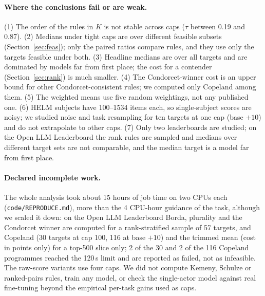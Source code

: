 \paragraph{Where the conclusions fail or are weak.}
(1) The order of the rules in $K$ is not stable across caps ($\tau$ between 0.19 and 0.87). (2) Medians under tight caps are over different feasible subsets (Section~\ref{sec:feas}); only the paired ratios compare rules, and they use only the targets feasible under both. (3) Headline medians are over all targets and are dominated by models far from first place; the cost for a contender (Section~\ref{sec:rank}) is much smaller. (4) The Condorcet-winner cost is an upper bound for other Condorcet-consistent rules; we computed only Copeland among them. (5) The weighted means use five random weightings, not any published one. (6) HELM subjects have 100--1534 items each, so single-subject scores are noisy; we studied noise and task resampling for ten targets at one cap (base $+10$) and do not extrapolate to other caps. (7) Only two leaderboards are studied; on the Open LLM Leaderboard the rank rules are sampled and medians over different target sets are not comparable, and the median target is a model far from first place.

\paragraph{Declared incomplete work.}
The whole analysis took about 15 hours of job time on two CPUs each (\texttt{code/REPRODUCE.md}), more than the 4 CPU-hour guidance of the task, although we scaled it down: on the Open LLM Leaderboard Borda, plurality and the Condorcet winner are computed for a rank-stratified sample of 57 targets, and Copeland (30 targets at cap 100, 116 at base $+10$) and the trimmed mean (cost in points only) for a top-500 slice only; 2 of the 30 and 2 of the 116 Copeland programmes reached the 120\,s limit and are reported as failed, not as infeasible. The raw-score variants use four caps. We did not compute Kemeny, Schulze or ranked-pairs rules, train any model, or check the single-actor model against real fine-tuning beyond the empirical per-task gains used as caps.
